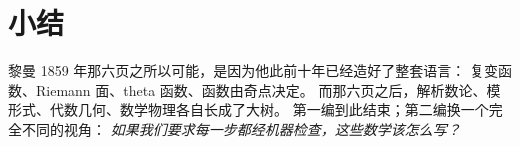 \section{小结}
\label{sec:05-summary}

黎曼 1859 年那六页之所以可能，是因为他此前十年已经造好了整套语言：
复变函数、Riemann 面、theta 函数、函数由奇点决定。
而那六页之后，解析数论、模形式、代数几何、数学物理各自长成了大树。
第一编到此结束；第二编换一个完全不同的视角：
\emph{如果我们要求每一步都经机器检查，这些数学该怎么写？}
